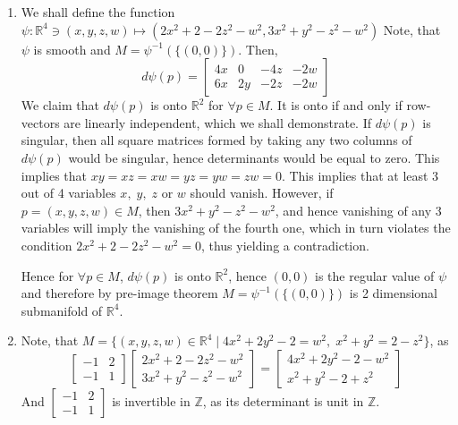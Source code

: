 \documentclass[8pt]{article} %
\begin{document}
\begin{enumerate}[label=(\arabic*)]
\item{We shall define the function $\psi:\mathbb{R}^4\ni(x,y,z,w)\mapsto (2x^2+2-2z^2-w^2,3x^2+y^2-z^2-w^2)$
	Note, that $\psi$ is smooth and $M=\psi^{-1}(\{(0,0)\})$. Then,
	\[d\psi(p)=\begin{bmatrix}4x&0&-4z&-2w\\6x&2y&-2z&-2w\end{bmatrix}\]
	We claim that $d\psi(p)$ is onto $\mathbb{R}^2$ for $\forall p\in M$. It is onto if and only if row-vectors are linearly independent,
	which we shall demonstrate. If $d\psi(p)$ is singular, then all square matrices formed by taking any two columns of $d\psi(p)$
	would be singular, hence determinants would be equal to zero. This implies that $xy=xz=xw=yz=yw=zw=0$. This implies that at least
	3 out of 4 variables $x,\;y,\;z$ or $w$ should vanish. However, if $p=(x,y,z,w)\in M$, then $3x^2+y^2-z^2-w^2$, and hence
	vanishing of any 3 variables will imply the vanishing of the fourth one, which in turn violates the condition $2x^2+2-2z^2-w^2=0$, thus
	yielding a contradiction. 
	
	Hence for $\forall p\in M$, $d\psi(p)$ is onto $\mathbb{R}^2$, hence $(0,0)$ is the regular value of $\psi$
	and therefore by pre-image theorem $M=\psi^{-1}(\{(0,0)\})$ is 2 dimensional submanifold of $\mathbb{R}^4$.
	}
\item{Note, that $M=\{(x,y,z,w)\in\mathbb{R}^4\mid 4x^2+2y^2-2=w^2,\;x^2+y^2=2-z^2\}$, as
	\[\begin{bmatrix}-1&2\\-1&1
	\end{bmatrix}\begin{bmatrix}
	2x^2+2-2z^2-w^2\\3x^2+y^2-z^2-w^2
	\end{bmatrix}=\begin{bmatrix}
	4x^2+2y^2-2-w^2\\x^2+y^2-2+z^2
	\end{bmatrix}\]
	And $\begin{bmatrix}-1&2\\-1&1\end{bmatrix}$ is invertible in $\mathbb{Z}$, as its determinant is unit in $\mathbb{Z}$.

}
\end{enumerate}
\end{document}
